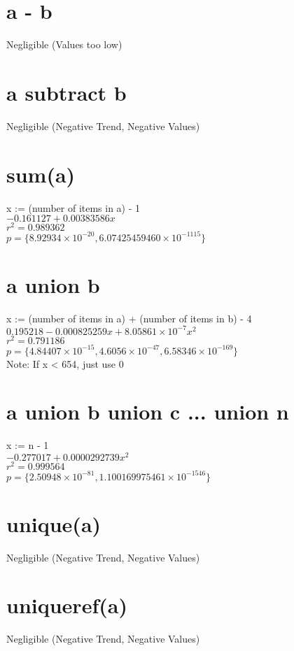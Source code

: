 \documentclass[12pt]{article}
\begin{document}
	\section{a - b}
	Negligible (Values too low)
	
	\section{a subtract b}
	Negligible (Negative Trend, Negative Values)
	
	\section{sum(a)}
	x := (number of items in a) - 1\\
	$-0.161127 + 0.00383586 x$\\
	$r^2 = 0.989362$\\
	$p = \{8.92934 \times 10^{-20}, 6.07425459460 \times 10^{-1115}\}$
	
	\section{a union b}
	x := (number of items in a) + (number of items in b) - 4\\
	$0.195218 - 0.000825259 x + 8.05861 \times 10^{-7} x^2$\\
	$r^2 = 0.791186$\\
	$p = \{4.84407 \times 10^{-15}, 4.6056 \times 10^{-47}, 6.58346 \times 10^{-169}\}$\\
	Note: If x < 654, just use 0
	
	\section{a union b union c ... union n}
	x := n - 1\\
	$-0.277017 + 0.0000292739 x^2$\\
	$r^2 = 0.999564$\\
	$p = \{2.50948 \times 10^{-81}, 1.100169975461 \times 10^{-1546}\}$
	
	\section{unique(a)}
	Negligible (Negative Trend, Negative Values)
	
	\section{uniqueref(a)}
	Negligible (Negative Trend, Negative Values)
	
\end{document}
